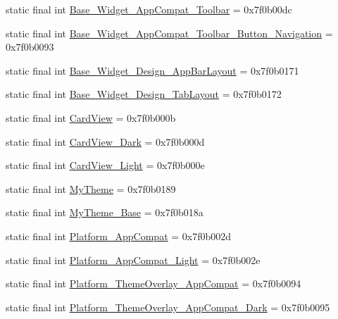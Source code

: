 \begin{CompactItemize}
\item 
static final int \hyperlink{classandroid_1_1support_1_1v7_1_1recyclerview_1_1_r_1_1style_7ff7056264b71453915868b124b52a0f}{Base\_\-Widget\_\-AppCompat\_\-Toolbar} = 0x7f0b00dc
\item 
static final int \hyperlink{classandroid_1_1support_1_1v7_1_1recyclerview_1_1_r_1_1style_6ac5d30d9ec7f6eb6398fa6745a6cd70}{Base\_\-Widget\_\-AppCompat\_\-Toolbar\_\-Button\_\-Navigation} = 0x7f0b0093
\item 
static final int \hyperlink{classandroid_1_1support_1_1v7_1_1recyclerview_1_1_r_1_1style_f13e019a46a2f2d3235f09b6aedbf3a7}{Base\_\-Widget\_\-Design\_\-AppBarLayout} = 0x7f0b0171
\item 
static final int \hyperlink{classandroid_1_1support_1_1v7_1_1recyclerview_1_1_r_1_1style_4ea4327f4e8f33699c7da9498c579196}{Base\_\-Widget\_\-Design\_\-TabLayout} = 0x7f0b0172
\item 
static final int \hyperlink{classandroid_1_1support_1_1v7_1_1recyclerview_1_1_r_1_1style_dec1ba0d4a4e55b870332a4c264bae66}{CardView} = 0x7f0b000b
\item 
static final int \hyperlink{classandroid_1_1support_1_1v7_1_1recyclerview_1_1_r_1_1style_1cf52b635876c60bb512e173ee13609b}{CardView\_\-Dark} = 0x7f0b000d
\item 
static final int \hyperlink{classandroid_1_1support_1_1v7_1_1recyclerview_1_1_r_1_1style_ff618bcdefa5416808319482309dbd02}{CardView\_\-Light} = 0x7f0b000e
\item 
static final int \hyperlink{classandroid_1_1support_1_1v7_1_1recyclerview_1_1_r_1_1style_89217811b804609599e2916869b2fa82}{MyTheme} = 0x7f0b0189
\item 
static final int \hyperlink{classandroid_1_1support_1_1v7_1_1recyclerview_1_1_r_1_1style_c56b0169e6e8a283107b93c776927c10}{MyTheme\_\-Base} = 0x7f0b018a
\item 
static final int \hyperlink{classandroid_1_1support_1_1v7_1_1recyclerview_1_1_r_1_1style_40abf5f68c993930c7f339c9a41dcc0f}{Platform\_\-AppCompat} = 0x7f0b002d
\item 
static final int \hyperlink{classandroid_1_1support_1_1v7_1_1recyclerview_1_1_r_1_1style_757c3537e2f67d40ef2cecce1888e56b}{Platform\_\-AppCompat\_\-Light} = 0x7f0b002e
\item 
static final int \hyperlink{classandroid_1_1support_1_1v7_1_1recyclerview_1_1_r_1_1style_fd6d88bf957b7fbbdf1b133757f55d0b}{Platform\_\-ThemeOverlay\_\-AppCompat} = 0x7f0b0094
\item 
static final int \hyperlink{classandroid_1_1support_1_1v7_1_1recyclerview_1_1_r_1_1style_ba9a83d5bc0cb7c30831007303d759b5}{Platform\_\-ThemeOverlay\_\-AppCompat\_\-Dark} = 0x7f0b0095

\end{CompactItemize}
